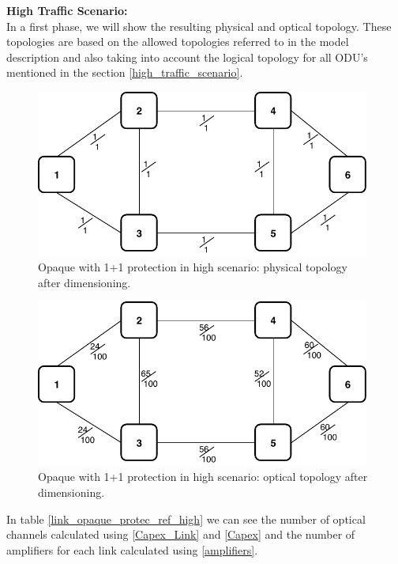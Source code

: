 \textbf{High Traffic Scenario:}\\

In a first phase, we will show the resulting physical and optical topology. These topologies are based on the allowed topologies referred to in the model description and also taking into account the logical topology for all ODU's mentioned in the section \ref{high_traffic_scenario}.\\

\begin{figure}[h!]
\centering
\includegraphics[width=11cm]{sdf/ilp/opaque_protection/figures/physical_topology}
\caption{Opaque with 1+1 protection in high scenario: physical topology after dimensioning.}
\label{physical_protectionhigh}
\end{figure}

\newpage
\begin{figure}[h!]
\centering
\includegraphics[width=11cm]{sdf/ilp/opaque_protection/figures/optical_topology_high}
\caption{Opaque with 1+1 protection in high scenario: optical topology after dimensioning.}
\label{optical_protectionhigh}
\end{figure}

In table \ref{link_opaque_protec_ref_high} we can see the number of optical channels calculated using \ref{Capex_Link} and \ref{Capex} and the number of amplifiers for each link calculated using \ref{amplifiers}.

